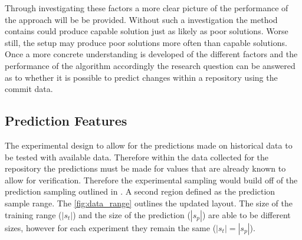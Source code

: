 Through investigating these factors a more clear picture of the performance of the approach will be be provided. Without such a investigation the method contains could produce capable solution just as likely as poor solutions. Worse still, the setup may produce poor solutions more often than capable solutions. Once a more concrete understanding is developed of the different factors and the performance of the algorithm accordingly the research question can be answered as to whether it is possible to predict changes within a repository using the commit data.

\subsection{Prediction Features}










The experimental design to allow for the predictions made on historical data to be tested with available data. Therefore within the data collected for the repository the predictions must be made for values that are already known to allow for verification. Therefore the experimental sampling would build off of the prediction sampling outlined in . A second region defined as the prediction sample range. The \autoref{fig:data_range} outlines the updated layout. The size of the training range ($|s_t|$) and the size of the prediction ($|s_p|$) are able to be different sizes, however for each experiment they remain the same ($|s_t| = |s_p|$).

